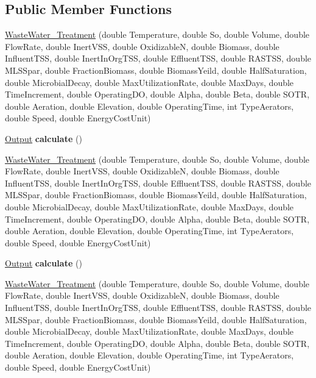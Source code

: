 \subsection*{Public Member Functions}
\begin{DoxyCompactItemize}
\item 
\hyperlink{class_waste_water___treatment_aec57a97589b18d14aecd786271b8b5be}{Waste\+Water\+\_\+\+Treatment} (double Temperature, double So, double Volume, double Flow\+Rate, double Inert\+V\+SS, double OxidizableN, double Biomass, double Influent\+T\+SS, double Inert\+In\+Org\+T\+SS, double Effluent\+T\+SS, double R\+A\+S\+T\+SS, double M\+L\+S\+Spar, double Fraction\+Biomass, double Biomass\+Yeild, double Half\+Saturation, double Microbial\+Decay, double Max\+Utilization\+Rate, double Max\+Days, double Time\+Increment, double Operating\+DO, double Alpha, double Beta, double S\+O\+TR, double Aeration, double Elevation, double Operating\+Time, int Type\+Aerators, double Speed, double Energy\+Cost\+Unit)
\item 
\mbox{\label{class_waste_water___treatment_a70bc7a071f6589037f6e3974fadc3e25}} 
\hyperlink{struct_waste_water___treatment_1_1_output}{Output} {\bfseries calculate} ()
\item 
\hyperlink{class_waste_water___treatment_aec57a97589b18d14aecd786271b8b5be}{Waste\+Water\+\_\+\+Treatment} (double Temperature, double So, double Volume, double Flow\+Rate, double Inert\+V\+SS, double OxidizableN, double Biomass, double Influent\+T\+SS, double Inert\+In\+Org\+T\+SS, double Effluent\+T\+SS, double R\+A\+S\+T\+SS, double M\+L\+S\+Spar, double Fraction\+Biomass, double Biomass\+Yeild, double Half\+Saturation, double Microbial\+Decay, double Max\+Utilization\+Rate, double Max\+Days, double Time\+Increment, double Operating\+DO, double Alpha, double Beta, double S\+O\+TR, double Aeration, double Elevation, double Operating\+Time, int Type\+Aerators, double Speed, double Energy\+Cost\+Unit)
\item 
\mbox{\label{class_waste_water___treatment_a11dd557c66157768516cb38a734533d2}} 
\hyperlink{struct_waste_water___treatment_1_1_output}{Output} {\bfseries calculate} ()
\item 
\hyperlink{class_waste_water___treatment_aec57a97589b18d14aecd786271b8b5be}{Waste\+Water\+\_\+\+Treatment} (double Temperature, double So, double Volume, double Flow\+Rate, double Inert\+V\+SS, double OxidizableN, double Biomass, double Influent\+T\+SS, double Inert\+In\+Org\+T\+SS, double Effluent\+T\+SS, double R\+A\+S\+T\+SS, double M\+L\+S\+Spar, double Fraction\+Biomass, double Biomass\+Yeild, double Half\+Saturation, double Microbial\+Decay, double Max\+Utilization\+Rate, double Max\+Days, double Time\+Increment, double Operating\+DO, double Alpha, double Beta, double S\+O\+TR, double Aeration, double Elevation, double Operating\+Time, int Type\+Aerators, double Speed, double Energy\+Cost\+Unit)

\end{DoxyCompactItemize}
